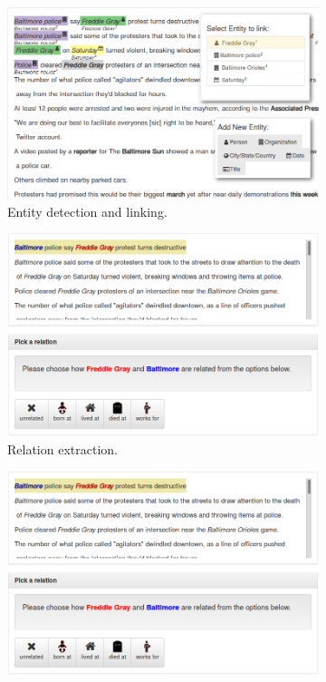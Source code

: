 \begin{figure}
\begin{subfigure}{0.31\textwidth}
  \includegraphics[width=\textwidth]{figures/extraction-interface}
  \caption{\label{fig:entity-interface} Entity detection and linking.}
\end{subfigure}
\hfill
\begin{subfigure}{0.31\textwidth}
  \includegraphics[width=\textwidth]{figures/relation-interface}
  \caption{\label{fig:relation-interface} Relation extraction.}
\end{subfigure}
\hfill
\begin{subfigure}{0.31\textwidth}
  \includegraphics[width=\textwidth]{figures/relation-interface}

\end{subfigure}
\end{figure}
